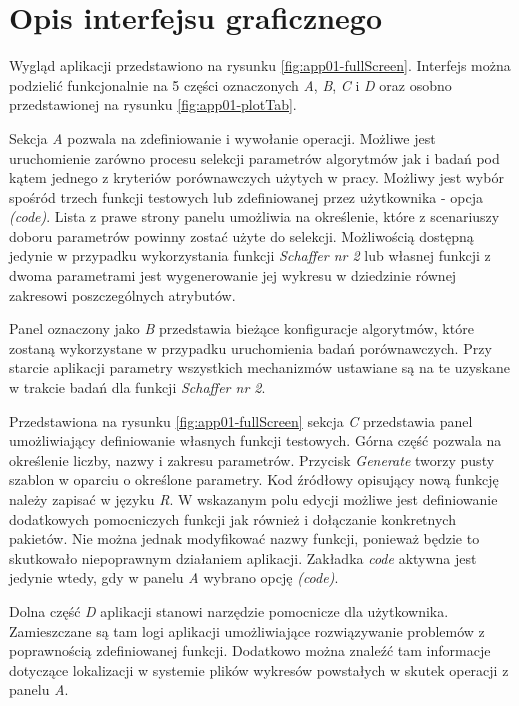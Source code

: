 \section{Opis interfejsu graficznego}

\par
Wygląd aplikacji przedstawiono na rysunku \ref{fig:app01-fullScreen}. Interfejs można podzielić funkcjonalnie na 5 części oznaczonych \emph{A}, \emph{B}, \emph{C} i \emph{D} oraz osobno przedstawionej na rysunku \ref{fig:app01-plotTab}. 

\par
Sekcja \emph{A} pozwala na zdefiniowanie i wywołanie operacji. Możliwe jest uruchomienie zarówno procesu selekcji parametrów algorytmów jak i badań pod kątem jednego z kryteriów porównawczych użytych w pracy. Możliwy jest wybór spośród trzech funkcji testowych lub zdefiniowanej przez użytkownika - opcja \emph{(code)}. Lista z prawe strony panelu umożliwia na określenie, które z scenariuszy doboru parametrów powinny zostać użyte do selekcji. Możliwością dostępną jedynie w przypadku wykorzystania funkcji \emph{Schaffer nr 2} lub własnej funkcji z dwoma parametrami jest wygenerowanie jej wykresu w dziedzinie równej zakresowi poszczególnych atrybutów. 
 
\par
Panel oznaczony jako \emph{B} przedstawia bieżące konfiguracje algorytmów, które zostaną wykorzystane w przypadku uruchomienia badań porównawczych. Przy starcie aplikacji parametry wszystkich mechanizmów ustawiane są na te uzyskane w trakcie badań dla funkcji \emph{Schaffer nr 2}.

\par
Przedstawiona na rysunku \ref{fig:app01-fullScreen} sekcja \emph{C} przedstawia panel umożliwiający definiowanie własnych funkcji testowych. Górna część pozwala na określenie liczby, nazwy i zakresu parametrów. Przycisk \emph{Generate} tworzy pusty szablon w oparciu o określone parametry. Kod źródłowy opisujący nową funkcję należy zapisać w języku \emph{R}. W wskazanym polu edycji możliwe jest definiowanie dodatkowych pomocniczych funkcji jak również i dołączanie konkretnych pakietów. Nie można jednak modyfikować nazwy funkcji, ponieważ będzie to skutkowało niepoprawnym działaniem aplikacji. Zakładka \emph{code} aktywna jest jedynie wtedy, gdy w panelu \emph{A} wybrano opcję \emph{(code)}.

\par
Dolna część \emph{D} aplikacji stanowi narzędzie pomocnicze dla użytkownika. Zamieszczane są tam logi aplikacji umożliwiające rozwiązywanie problemów z poprawnością zdefiniowanej funkcji. Dodatkowo można znaleźć tam informacje dotyczące lokalizacji w systemie plików wykresów powstałych w skutek operacji z panelu \emph{A}. 


